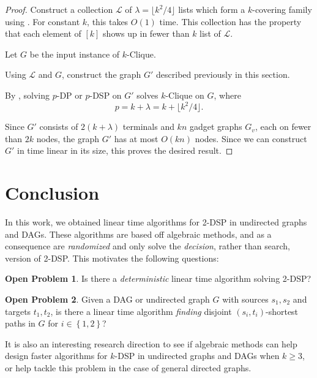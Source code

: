 \documentclass[11pt]{article}
\newcommand{\set}[1]{\left\{#1\right\}}
\newcommand{\ca}{\mathcal}
\theoremstyle{definition}
\newtheorem{open}{Open Problem}
\begin{document}
\lbdp*
\begin{proof}
    Construct a collection $\ca{L}$ of $\lambda=\lfloor k^2/4\rfloor$ lists which form a $k$-covering family using .
    For constant $k$, this takes $O(1)$ time.
    This collection has the property that each element of $[k]$ shows up in fewer than $k$ list of $\mathcal{L}$.

    Let $G$ be the input instance of \textsf{$k$-Clique}.

    Using $\ca{L}$ and $G$, construct the graph $G'$ described previously in this section.
    
    By , solving \textsf{$p$-DP} or \textsf{$p$-DSP} on $G'$ solves \textsf{$k$-Clique} on $G$, where 
        \[p = k + \lambda = k + \lfloor k^2/4\rfloor.\]
    
    Since $G'$ consists of $2(k + \lambda)$ terminals and $kn$ gadget graphs $G_v$, each on fewer than $2k$ nodes, the graph $G'$ has at most $O(kn)$ nodes.
    Since we can construct $G'$ in time linear in its size, this proves the desired result.
\end{proof}


\section{Conclusion}
\label{sec:conclusion}

In this work, we obtained linear time algorithms for \textsf{2-DSP} in undirected graphs and DAGs.
These algorithms are based off algebraic methods, and as a consequence are \emph{randomized} and only solve the \emph{decision}, rather than search, version of \textsf{2-DSP}.
This motivates the following questions:

\begin{open}
    Is there a \emph{deterministic} linear time algorithm solving \textsf{2-DSP}?
\end{open}

\begin{open}
    Given a DAG or undirected graph $G$  with sources $s_1, s_2$ and targets $t_1, t_2$, is there a linear time algorithm \emph{finding} disjoint $(s_i,t_i)$-shortest paths in $G$ for $i\in \set{1,2}$?
\end{open}

It is also an interesting research direction to see if algebraic methods can help design faster algorithms for \textsf{$k$-DSP} in undirected graphs and DAGs when $k\ge 3$, or help tackle this problem in the case of general directed graphs.
\end{document}

